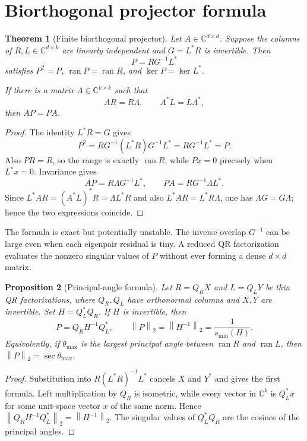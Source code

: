 \documentclass[11pt]{article}
\newtheorem{theorem}{Theorem}[section]
\newtheorem{proposition}[theorem]{Proposition}
\theoremstyle{remark}
\newcommand{\norm}[1]{\left\lVert#1\right\rVert}
\newcommand{\C}{\mathbb C}
\begin{document}
\section{Biorthogonal projector formula}

\begin{theorem}[Finite biorthogonal projector]\label{thm:projector}
Let $A\in\C^{d\times d}$.  Suppose the columns of $R,L\in\C^{d\times k}$
are linearly independent and $G=L^*R$ is invertible.  Then
\[
 P=RG^{-1}L^*
\]
satisfies $P^2=P$, $\operatorname{ran}P=\operatorname{ran}R$, and
$\ker P=\ker L^*$.

If there is a matrix $\Lambda\in\C^{k\times k}$ such that
\[
 AR=R\Lambda,
 \qquad
 A^*L=L\Lambda^*,
\]
then $AP=PA$.
\end{theorem}

\begin{proof}
The identity $L^*R=G$ gives
\[
 P^2=RG^{-1}(L^*R)G^{-1}L^*=RG^{-1}L^*=P.
\]
Also $PR=R$, so the range is exactly $\operatorname{ran}R$, while
$Px=0$ precisely when $L^*x=0$.  Invariance gives
\[
 AP=R\Lambda G^{-1}L^*,
 \qquad
 PA=RG^{-1}\Lambda L^*.
\]
Since $L^*AR=(A^*L)^*R=\Lambda L^*R$ and also
$L^*AR=L^*R\Lambda$, one has $\Lambda G=G\Lambda$; hence the two expressions
coincide.
\end{proof}

The formula is exact but potentially unstable.  The inverse overlap
$G^{-1}$ can be large even when each eigenpair residual is tiny.  A reduced
QR factorization evaluates the nonzero singular values of $P$ without ever
forming a dense $d\times d$ matrix.

\begin{proposition}[Principal-angle formula]\label{prop:angle}
Let $R=Q_RX$ and $L=Q_LY$ be thin QR factorizations, where $Q_R,Q_L$ have
orthonormal columns and $X,Y$ are invertible.  Set
$H=Q_L^*Q_R$.  If $H$ is invertible, then
\[
 P=Q_RH^{-1}Q_L^*,
 \qquad
 \norm P_2=\norm{H^{-1}}_2=\frac{1}{s_{\min}(H)}.
\]
Equivalently, if $\theta_{\max}$ is the largest principal angle between
$\operatorname{ran}R$ and $\operatorname{ran}L$, then
$\norm P_2=\sec\theta_{\max}$.
\end{proposition}

\begin{proof}
Substitution into $R(L^*R)^{-1}L^*$ cancels $X$ and $Y^*$ and gives the
first formula.  Left multiplication by $Q_R$ is isometric, while every
vector in $\mathbb C^k$ is $Q_L^*x$ for some unit-space vector $x$ of the
same norm.  Hence $\norm{Q_RH^{-1}Q_L^*}_2=\norm{H^{-1}}_2$.  The singular
values of $Q_L^*Q_R$ are the cosines of the principal angles.
\end{proof}
\end{document}
